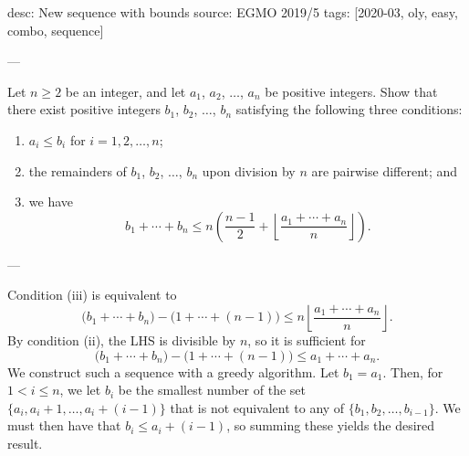desc: New sequence with bounds
source: EGMO 2019/5
tags: [2020-03, oly, easy, combo, sequence]

---

Let $n\ge 2$ be an integer, and let $a_1$, $a_2$, $\ldots$, $a_n$ be positive integers. Show that there exist positive integers $b_1$, $b_2$, $\ldots$, $b_n$ satisfying the following three conditions:
\begin{enumerate}[label=(\roman*)]
\item $a_i\le b_i$ for $i=1,2,\ldots,n$;
\item the remainders of $b_1$, $b_2$, $\ldots$, $b_n$ upon division by $n$ are pairwise different; and
\item we have \[b_1+\cdots+b_n\le n\left(\frac{n-1}2+\left\lfloor\frac{a_1+\cdots+a_n}n\right\rfloor\right).\]
\end{enumerate}

---

Condition (iii) is equivalent to \[\big(b_1+\cdots+b_n\big)-\big(1+\cdots+(n-1)\big)\le n\left\lfloor\frac{a_1+\cdots+a_n}n\right\rfloor.\]
By condition (ii), the LHS is divisible by $n$, so it is sufficient for \[\big(b_1+\cdots+b_n\big)-\big(1+\cdots+(n-1)\big)\le a_1+\cdots+a_n.\]
We construct such a sequence with a greedy algorithm. Let $b_1=a_1$. Then, for $1<i\le n$, we let $b_i$ be the smallest number of the set $\{a_i,a_i+1,\ldots,a_i+(i-1)\}$ that is not equivalent to any of $\{b_1,b_2,\ldots,b_{i-1}\}$. We must then have that $b_i\le a_i+(i-1)$, so summing these yields the desired result.
